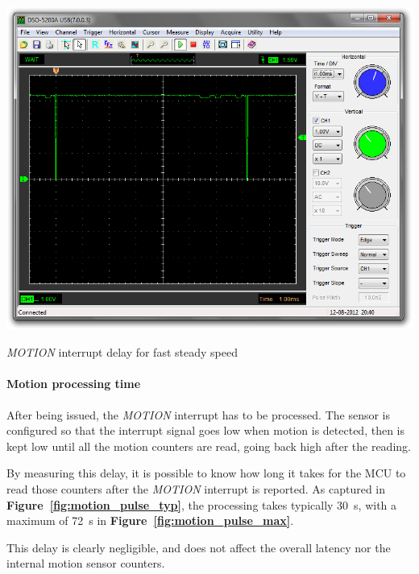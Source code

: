 \documentclass[a4paper,10pt]{article}
\makeatletter
\newenvironment{figurehere}{\def\@captype{figure}\vspace{2ex}}{\vspace{2ex}}
\newcommand{\citef}[1]{\textbf{Figure~\ref{#1}}}
\makeatother
\begin{document}
\begin{multicols}{2}
\begin{figurehere}
	\centering
	\includegraphics[keepaspectratio=true,width=\columnwidth]{images/motion_delay_fast.png}
	\caption{\emph{MOTION} interrupt delay for fast steady speed}
	\label{fig:motion_delay_fast}
\end{figurehere}


\paragraph{Motion processing time}
After being issued, the \emph{MOTION} interrupt has to be processed. The
sensor is configured so that the interrupt signal goes low when motion is
detected, then is kept low until all the motion counters are read, going back
high after the reading.

By measuring this delay, it is possible to know how long it takes for the MCU
to read those counters after the \emph{MOTION} interrupt is reported. As
captured in \citef{fig:motion_pulse_typ}, the processing takes typically
30~{\textmu}s, with a maximum of 72~{\textmu}s in \citef{fig:motion_pulse_max}.

This delay is clearly negligible, and does not affect the overall latency nor
the internal motion sensor counters.


\end{multicols}
\end{document}
